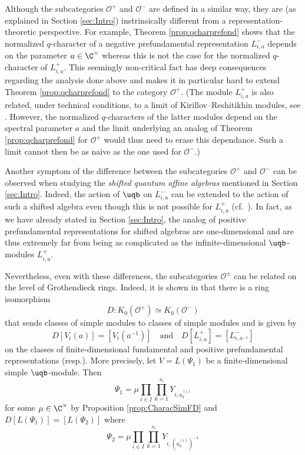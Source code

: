 \documentclass[11pt]{amsart}
\theoremstyle{definition}
\theoremstyle{remark}
\numberwithin{equation}{section}
\begin{document}
Although the subcategories $\mathcal{O}^+$ and $\mathcal{O}^-$ are defined in a similar way, they are (as explained in Section \ref{sec:Intro}) instrinsically different from a representation-theoretic perspective. For example, Theorem \ref{prop:qcharprefond} shows that the normalized $q$-character of a negative prefundamental representation $L_{i,a}^-$ depends on the parameter $a\in \C^{\times}$ whereas this is not the case for the normalized $q$-character of $L_{i,a}^+$. This seemingly non-critical fact has deep consequences regarding the analysis done above and makes it in particular hard to extend Theorem \ref{prop:qcharprefond} to the category $\mathcal{O}^+$. (The module $L_{i,a}^+$ is also related, under technical conditions, to a limit of Kirillov--Reshitikhin modules, see \cite{hj}. However, the normalized $q$-characters of the latter modules depend on the spectral parameter $a$ and the limit underlying an analog of Theorem \ref{prop:qcharprefond} for $\mathcal{O}^+$ would thus need to erase this dependance. Such a limit cannot then be as naive as the one used for $\mathcal{O}^-$.) 
\par
Another symptom of the difference between the subcategories $\mathcal{O}^{+}$ and $\mathcal{O}^-$ can be observed when studying the \textit{shifted quantum affine algebras} mentioned in Section \ref{sec:Intro}. Indeed, the action of $\uqb$ on $L_{i,a}^-$ can be extended to the action of such a shifted algebra even though this is not possible for $L_{i,a}^+$ (cf.~\cite[Section 4]{hshift}). In fact, as we have already stated in Section \ref{sec:Intro}, the analog of positive prefundamental representations for shifted algebras are one-dimensional and are thus extremely far from being as complicated as the infinite-dimensional $\uqb$-modules $L_{i,a}^+$.
\par
Nevertheless, even with these differences, the subcategories $\mathcal{O}^{\pm}$ can be related on the level of Grothendieck rings. Indeed, it is shown in \cite[Sections 5-7]{hl2} that there is a ring isomorphism $$ D : K_0(\mathcal{O}^+) \simeq K_0(\mathcal{O}^-) $$ 
that sends classes of simple modules to classes of simple modules and is given by
$$ D[V_i(a)] = [V_i(a^{-1})] \quad \text{and}\quad D[L_{i,a}^+] = [L_{i,a^{-1}}^-]$$
on the classes of finite-dimensional fundamental and positive prefundamental representations (resp.). More precisely, let $V=L(\Psi_1)$ be a finite-dimensional simple $\uqb$-module. Then $$\textstyle \Psi_1= \mu\prod_{i\in I}\prod_{k=1}^{s_i} Y_{i,a_k^{(i)}}$$ for some $\mu\in \C^{\times}$ by Proposition \ref{prop:CharacSimFD} and $D[L(\Psi_1)] = [L(\Psi_2)]$ where $$ \textstyle \Psi_2 = \mu\prod_{i\in I}\prod_{k=1}^{s_i} Y_{i,(a_k^{(i)})^{-1}} $$
\end{document}
